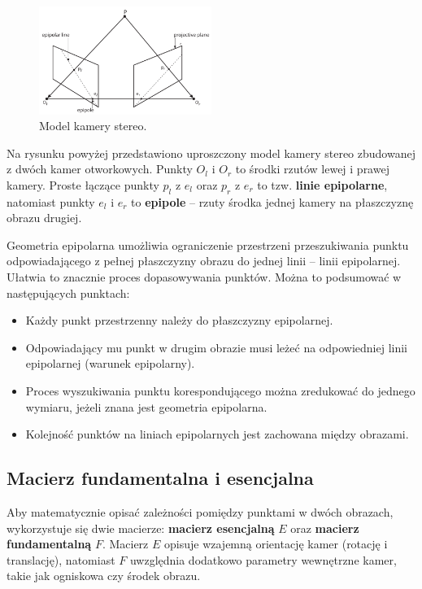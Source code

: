 \documentclass[magisterska]{pracadypl}
\begin{document}
\begin{figure}[H]
    \centering
    \includegraphics[width=0.5\textwidth]{images/epipolar.png}
    \captionsetup{font=footnotesize}
    \caption[Model kamery stereo. Learning OpenCV 3, O'Reilly, Str. 709]{Model kamery stereo.}
    \label{fig:rpi}
\end{figure}

Na rysunku powyżej przedstawiono uproszczony model kamery stereo zbudowanej z dwóch kamer otworkowych. Punkty $O_l$ i $O_r$ to środki rzutów lewej i prawej kamery. Proste łączące punkty $p_l$ z $e_l$ oraz $p_r$ z $e_r$ to tzw. \textbf{linie epipolarne}, natomiast punkty $e_l$ i $e_r$ to \textbf{epipole} – rzuty środka jednej kamery na płaszczyznę obrazu drugiej.

Geometria epipolarna umożliwia ograniczenie przestrzeni przeszukiwania punktu odpowiadającego z pełnej płaszczyzny obrazu do jednej linii – linii epipolarnej. Ułatwia to znacznie proces dopasowywania punktów. Można to podsumować w następujących punktach:

\begin{itemize}
    \item Każdy punkt przestrzenny należy do płaszczyzny epipolarnej.
    \item Odpowiadający mu punkt w drugim obrazie musi leżeć na odpowiedniej linii epipolarnej (warunek epipolarny).
    \item Proces wyszukiwania punktu korespondującego można zredukować do jednego wymiaru, jeżeli znana jest geometria epipolarna.
    \item Kolejność punktów na liniach epipolarnych jest zachowana między obrazami.
\end{itemize}

\subsection{Macierz fundamentalna i esencjalna}

Aby matematycznie opisać zależności pomiędzy punktami w dwóch obrazach, wykorzystuje się dwie macierze: \textbf{macierz esencjalną} $E$ oraz \textbf{macierz fundamentalną} $F$. Macierz $E$ opisuje wzajemną orientację kamer (rotację i translację), natomiast $F$ uwzględnia dodatkowo parametry wewnętrzne kamer, takie jak ogniskowa czy środek obrazu.
\end{document}
